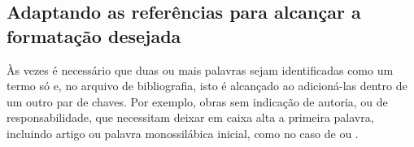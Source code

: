 

\subsection{Adaptando as referências para alcançar a formatação desejada}







Às vezes é necessário que duas ou mais palavras sejam identificadas como um termo só e, no arquivo de bibliografia, isto é alcançado ao adicioná-las dentro de um outro par de chaves. Por exemplo, obras sem indicação de autoria, ou de responsabilidade, que necessitam deixar em caixa alta a primeira palavra, incluindo artigo ou palavra monossilábica inicial, como no caso de  ou .
